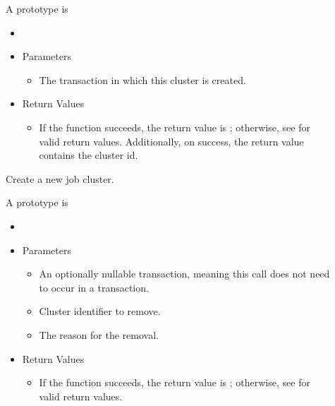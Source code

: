 \begin{description}
\item []
  A prototype is 

  \begin{itemize}
    \item[] 
    \item[] Parameters
    \begin{itemize}
      \item[]  

      The transaction in which this cluster is created.
    \end{itemize}
    \item[] Return Values
    \begin{itemize}
      \item[] If the function succeeds, the return value is ; 
      otherwise, see  for valid return values. Additionally,
      on success, the return value contains the cluster id.
    \end{itemize}
  \end{itemize}

  Create a new job cluster.
\item []
  A prototype is 

  \begin{itemize}
    \item[] 
    \item[] Parameters
    \begin{itemize}
      \item[]  

      An optionally nullable transaction, meaning this call does not 
      need to occur in a transaction. 
      \item[]  

      Cluster identifier to remove.
      \item[] 

      The reason for the removal.
    \end{itemize}
    \item[] Return Values
    \begin{itemize}
      \item[] If the function succeeds, the return value is ; 
      otherwise, see  for valid return values. 
    \end{itemize}
  \end{itemize}


\end{description}
